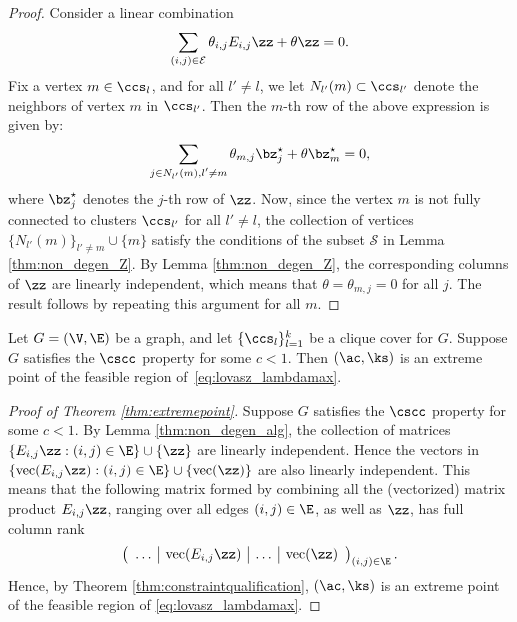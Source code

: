 \begin{proof}
Consider a linear combination  
$$
\sum_{(i,j) \in \mathcal{E}} \theta_{i,j} E_{i,j} \zz  + \theta \zz = 0.
$$
Fix a vertex $m \in \ccs_l$, and for all $l' \neq l$, we let $N_{l'}(m) \subset \ccs_{l'}$ denote the neighbors of vertex $m$ in $\ccs_{l'}$.  Then the $m$-th row of the above expression is given by:
$$
\sum_{\substack{ j\in N_{l'}(m), l'\ne m}} \theta_{m,j} \bz^\star_j + \theta \bz^\star_m=0,
$$
where $\bz_j^\star$ denotes the $j$-th row of $\zz$. %
Now, since the vertex $m$ is not fully connected to clusters $\ccs_{l'}$ for all $l' \neq l$, the collection of vertices $\{N_{l'}(m)\}_{l' \neq m}\cup \{m\}$ satisfy the conditions of the subset $\mathcal{S}$ in Lemma \ref{thm:non_degen_Z}.  By Lemma \ref{thm:non_degen_Z}, the corresponding columns of $\zz$ are linearly independent, which means that $\theta = \theta_{m,j} = 0$ for all $j$.  The result follows by repeating this argument for all $m$.
\end{proof}



\begin{theorem} \label{thm:extremepoint}
Let $G = (\V, \E)$ be a graph, and let $\{\ccs_l\}_{l=1}^{k}$ be a clique cover for $G$.  Suppose $G$ satisfies the $\cscc$ property for some $c<1$.  Then $(\ac,\ks)$ is an extreme point of the feasible region of~\eqref{eq:lovasz_lambdamax}.
\end{theorem}

\begin{proof}[Proof of Theorem \ref{thm:extremepoint}]  Suppose $G$ satisfies the $\cscc$ property for some $c<1$.  By Lemma \ref{thm:non_degen_alg}, the collection of matrices $\{ E_{i,j} \zz : (i,j) \in \E \} \cup \{ \zz \}$ are linearly independent.  Hence the vectors in $\{ {\rm vec}( E_{i,j} \zz) : (i,j) \in \E \} \cup \{ {\rm vec}(\zz) \}$ are also linearly independent. %
This means that the  following matrix formed by combining all the (vectorized) matrix product $E_{i,j} \zz$, ranging over all edges $(i,j) \in \E$, as well as $\zz$, has full column rank
$$
\left( \begin{array}{c|c|c|c}
\ldots & \mathrm{vec}( E_{i,j} \zz) & \ldots
& \mathrm{vec}(\zz)\end{array} \right)_{(i,j) \in \E}.
$$ 
Hence, by Theorem \ref{thm:constraintqualification}, $(\ac,\ks)$ is an extreme point of the feasible region of \eqref{eq:lovasz_lambdamax}.
\end{proof}

